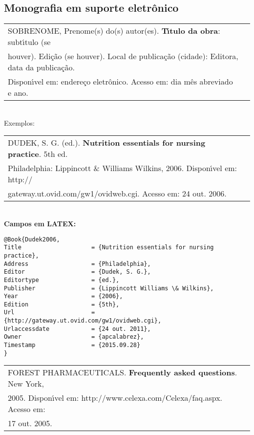 \subsection{Monografia em suporte eletr\^onico}	 

\begin{tabular}{|l|c|} \hline
	SOBRENOME, Prenome(s) do(s) autor(es). \textbf{T\'{\i}tulo da obra}: 
	subt\'{\i}tulo (se \\ houver). Edi\c{c}\~ao (se houver). Local de publica\c{c}\~ao (cidade): Editora, data da publica\c{c}\~ao. \\ Dispon\'{\i}vel em: endere\c{c}o eletr\^onico. Acesso em: dia m\^es abreviado e ano.     \\\hline
\end{tabular} \\

Exemplos: \\ 

\begin{tabular}{|l|c|} \hline
	DUDEK, S. G. (ed.). \textbf{Nutrition essentials for nursing practice}. 5th ed.\\  Philadelphia: Lippincott \& Williams  Wilkins, 2006. Dispon\'{\i}vel em: http:// \\gateway.ut.ovid.com/gw1/ovidweb.cgi. Acesso em: 24 out. 2006.  \\\hline
\end{tabular} \\ 

\textbf{Campos em LATEX:} 

\begin{verbatim}
@Book{Dudek2006,
Title                    = {Nutrition essentials for nursing practice},
Address                  = {Philadelphia},
Editor                   = {Dudek, S. G.},
Editortype               = {ed.},
Publisher                = {Lippincott Williams \& Wilkins},
Year                     = {2006},
Edition                  = {5th},
Url                      = {http://gateway.ut.ovid.com/gw1/ovidweb.cgi},
Urlaccessdate            = {24 out. 2011},
Owner                    = {apcalabrez},
Timestamp                = {2015.09.28}
}
\end{verbatim}


\begin{tabular}{|l|c|} \hline
	FOREST PHARMACEUTICALS. \textbf{Frequently asked questions}. New York, \\ 2005. Dispon\'{\i}vel em:  http://www.celexa.com/Celexa/faq.aspx. Acesso em: \\ 17 out. 2005.   \\\hline
\end{tabular} \\ 

